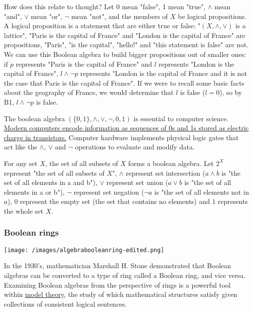 \documentclass{article} %
\begin{document}
\begin{itemize}
{\begin{itemize}
\begin{itemize}
How does this relate to thought? Let $ 0$ mean "false", 1 mean "true", $ \land$ mean "and", $ \lor$ mean "or", $ \neg$ mean "not", and the members of $ X$ be logical propositions. A logical proposition is a statement that are either true or false: "$ (X, \land, \lor)$ is a lattice", "Paris is the capital of France" and "London is the capital of France" are propositions, "Paris", "is the capital", "hello!" and "this statement is false" are not.  We can use this Boolean algebra to build bigger propositions out of smaller ones: if $ p$ represents "Paris is the capital of France" and $ l$ represents "London is the capital of France", $ l \land \neg p$ represents "London is the capital of France and it is not the case that Paris is the capital of France". If we were to recall some basic facts about the geography of France, we would determine that $ l$ is false ($ l = 0$), so by B1, $ l \land \neg p$ is false.

The boolean algebra $ (\{0, 1\}, \land, \lor, \neg, 0, 1)$ is essential to computer science. \href{https://www.bbc.co.uk/bitesize/guides/zwsbwmn/revision/1}{Modern computers encode information as sequences of 0s and 1s stored as electric charge in transistors.} Computer hardware implements physical logic gates that act like the $ \land$, $ \lor$ and $ \neg$ operations to evaluate and modify data. 

For any set $ X$, the set of all subsets of $ X$ forms a boolean algebra. Let $ 2^X$ represent "the set of all subsets of $ X$", $ \land$ represent set intersection ($ a\land b$ is "the set of all elements in a and b"), $ \lor$ represent set union ($ a \lor b$ is "the set of all elements in a or b"), $ \neg$ represent set negation ($ \neg a$ is "the set of all elements not in $ a$), $ 0$ represent the empty set (the set that contains no elements) and $ 1$ represents the whole set $ X$. 

\subsubsection{Boolean rings}

\texttt{[image: /images/algebrabooleanring-edited.png]}

In the 1930's, mathematician Marshall H. Stone demonstrated that Boolean algebras can be converted to a type of ring called a Boolean ring, and vice versa. Examining Boolean algebras from the perspective of rings is a powerful tool within \href{https://plato.stanford.edu/entries/model-theory/}{model theory}, the study of which mathematical structures satisfy given collections of consistent logical sentences.


\end{itemize}
\end{itemize}}
\end{itemize}
\end{document}
